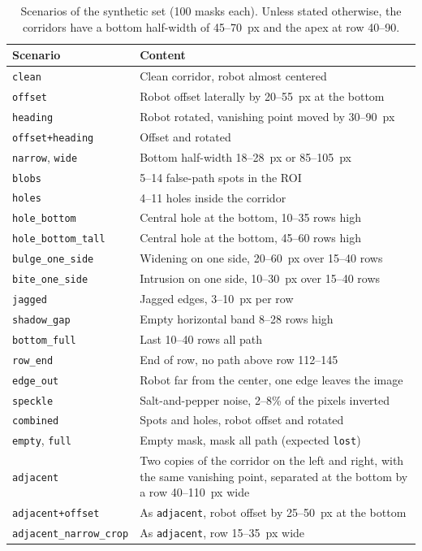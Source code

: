 \begin{table}[htbp]
    \centering
    \footnotesize
    \caption{Scenarios of the synthetic set (100 masks each). Unless stated otherwise, the corridors have a bottom half-width of 45--70~px and the apex at row 40--90.}
    \label{tab:c7_scenarios}
    \begin{tabularx}{\textwidth}{@{}lX@{}}
        \toprule
        Scenario & Content \\
        \midrule
        \texttt{clean} & Clean corridor, robot almost centered \\
        \texttt{offset} & Robot offset laterally by 20--55~px at the bottom \\
        \texttt{heading} & Robot rotated, vanishing point moved by 30--90~px \\
        \texttt{offset+heading} & Offset and rotated \\
        \texttt{narrow}, \texttt{wide} & Bottom half-width 18--28~px or 85--105~px \\
        \texttt{blobs} & 5--14 false-path spots in the ROI \\
        \texttt{holes} & 4--11 holes inside the corridor \\
        \texttt{hole\_bottom} & Central hole at the bottom, 10--35 rows high \\
        \texttt{hole\_bottom\_tall} & Central hole at the bottom, 45--60 rows high \\
        \texttt{bulge\_one\_side} & Widening on one side, 20--60~px over 15--40 rows \\
        \texttt{bite\_one\_side} & Intrusion on one side, 10--30~px over 15--40 rows \\
        \texttt{jagged} & Jagged edges, 3--10~px per row \\
        \texttt{shadow\_gap} & Empty horizontal band 8--28 rows high \\
        \texttt{bottom\_full} & Last 10--40 rows all path \\
        \texttt{row\_end} & End of row, no path above row 112--145 \\
        \texttt{edge\_out} & Robot far from the center, one edge leaves the image \\
        \texttt{speckle} & Salt-and-pepper noise, 2--8\% of the pixels inverted \\
        \texttt{combined} & Spots and holes, robot offset and rotated \\
        \texttt{empty}, \texttt{full} & Empty mask, mask all path (expected \texttt{lost}) \\
        \texttt{adjacent} & Two copies of the corridor on the left and right, with the same vanishing point, separated at the bottom by a row 40--110~px wide \\
        \texttt{adjacent+offset} & As \texttt{adjacent}, robot offset by 25--50~px at the bottom \\
        \texttt{adjacent\_narrow\_crop} & As \texttt{adjacent}, row 15--35~px wide \\
        \bottomrule
    \end{tabularx}
\end{table}

